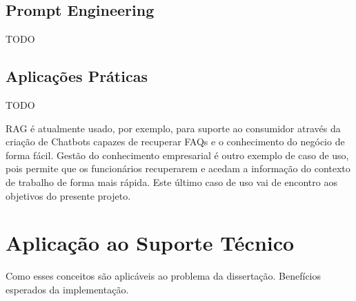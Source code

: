 \subsection{Prompt Engineering}

TODO

\subsection{Aplicações Práticas}

TODO 

RAG é atualmente usado, por exemplo, para suporte ao consumidor através da criação de Chatbots capazes de recuperar FAQs e o conhecimento do negócio de forma fácil. Gestão do conhecimento empresarial é outro exemplo de caso de uso, pois permite que os funcionários recuperarem e acedam a informação do contexto de trabalho de forma mais rápida. Este último caso de uso vai de encontro aos objetivos do presente projeto. 



\section{Aplicação ao Suporte Técnico}

Como esses conceitos são aplicáveis ao problema da dissertação.
Benefícios esperados da implementação.
